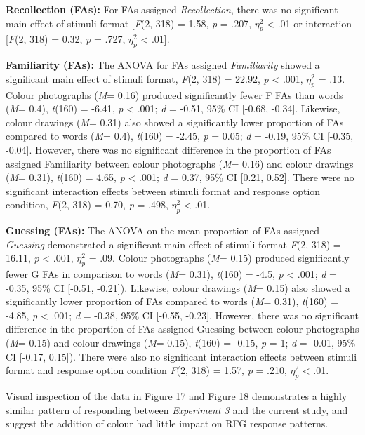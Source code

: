 \documentclass[
  11pt,
]{article}
\begin{document}
\textbf{Recollection (FAs):} For FAs assigned \emph{Recollection}, there
was no significant main effect of stimuli format {[}\emph{F}(2, 318) =
1.58, \emph{p} = .207, \(\eta^2_p\) \textless{} .01 or interaction
{[}\emph{F}(2, 318) = 0.32, \emph{p} = .727, \(\eta^2_p\) \textless{}
.01{]}.

\textbf{Familiarity (FAs):} The ANOVA for FAs assigned
\emph{Familiarity} showed a significant main effect of stimuli format,
\emph{F}(2, 318) = 22.92, \emph{p} \textless{} .001, \(\eta^2_p\) = .13.
Colour photographs (\emph{M}= 0.16) produced significantly fewer F FAs
than words (\emph{M}= 0.4), \emph{t}(160) = -6.41, \emph{p} \textless{}
.001; \emph{d} = -0.51, 95\% CI {[}-0.68, -0.34{]}. Likewise, colour
drawings (\emph{M}= 0.31) also showed a significantly lower proportion
of FAs compared to words (\emph{M}= 0.4), \emph{t}(160) = -2.45,
\emph{p} = 0.05; \emph{d} = -0.19, 95\% CI {[}-0.35, -0.04{]}. However,
there was no significant difference in the proportion of FAs assigned
Familiarity between colour photographs (\emph{M}= 0.16) and colour
drawings (\emph{M}= 0.31), \emph{t}(160) = 4.65, \emph{p} \textless{}
.001; \emph{d} = 0.37, 95\% CI {[}0.21, 0.52{]}. There were no
significant interaction effects between stimuli format and response
option condition, \emph{F}(2, 318) = 0.70, \emph{p} = .498, \(\eta^2_p\)
\textless{} .01.

\textbf{Guessing (FAs):} The ANOVA on the mean proportion of FAs
assigned \emph{Guessing} demonstrated a significant main effect of
stimuli format \emph{F}(2, 318) = 16.11, \emph{p} \textless{} .001,
\(\eta^2_p\) = .09. Colour photographs (\emph{M}= 0.15) produced
significantly fewer G FAs in comparison to words (\emph{M}= 0.31),
\emph{t}(160) = -4.5, \emph{p} \textless{} .001; \emph{d} = -0.35, 95\%
CI {[}-0.51, -0.21{]}). Likewise, colour drawings (\emph{M}= 0.15) also
showed a significantly lower proportion of FAs compared to words
(\emph{M}= 0.31), \emph{t}(160) = -4.85, \emph{p} \textless{} .001;
\emph{d} = -0.38, 95\% CI {[}-0.55, -0.23{]}. However, there was no
significant difference in the proportion of FAs assigned Guessing
between colour photographs (\emph{M}= 0.15) and colour drawings
(\emph{M}= 0.15), \emph{t}(160) = -0.15, \emph{p} = 1; \emph{d} = -0.01,
95\% CI {[}-0.17, 0.15{]}). There were also no significant interaction
effects between stimuli format and response option condition \emph{F}(2,
318) = 1.57, \emph{p} = .210, \(\eta^2_p\) \textless{} .01.

Visual inspection of the data in Figure 17 and Figure 18 demonstrates a
highly similar pattern of responding between \emph{Experiment 3} and the
current study, and suggest the addition of colour had little impact on
RFG response patterns.
\end{document}
